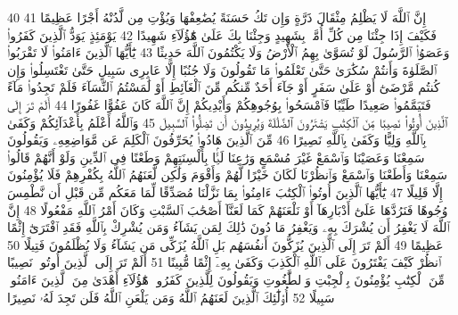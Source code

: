 {\tiny\colorbox{cl_aya}{40}} إِنَّ ٱللَّهَ لَا يَظْلِمُ مِثْقَالَ ذَرَّةٍ وَإِن تَكُ حَسَنَةً يُضَٰعِفْهَا وَيُؤْتِ مِن لَّدُنْهُ أَجْرًا عَظِيمًا
{\tiny\colorbox{cl_aya}{41}} فَكَيْفَ إِذَا جِئْنَا مِن كُلِّ أُمَّةٍۭ بِشَهِيدٍ وَجِئْنَا بِكَ عَلَىٰ هَٰٓؤُلَآءِ شَهِيدًا
{\tiny\colorbox{cl_aya}{42}} يَوْمَئِذٍ يَوَدُّ ٱلَّذِينَ كَفَرُوا۟ وَعَصَوُا۟ ٱلرَّسُولَ لَوْ تُسَوَّىٰ بِهِمُ ٱلْأَرْضُ وَلَا يَكْتُمُونَ ٱللَّهَ حَدِيثًا
{\tiny\colorbox{cl_aya}{43}} يَٰٓأَيُّهَا ٱلَّذِينَ ءَامَنُوا۟ لَا تَقْرَبُوا۟ ٱلصَّلَوٰةَ وَأَنتُمْ سُكَٰرَىٰ حَتَّىٰ تَعْلَمُوا۟ مَا تَقُولُونَ وَلَا جُنُبًا إِلَّا عَابِرِى سَبِيلٍ حَتَّىٰ تَغْتَسِلُوا۟ وَإِن كُنتُم مَّرْضَىٰٓ أَوْ عَلَىٰ سَفَرٍ أَوْ جَآءَ أَحَدٌ مِّنكُم مِّنَ ٱلْغَآئِطِ أَوْ لَٰمَسْتُمُ ٱلنِّسَآءَ فَلَمْ تَجِدُوا۟ مَآءً فَتَيَمَّمُوا۟ صَعِيدًا طَيِّبًا فَٱمْسَحُوا۟ بِوُجُوهِكُمْ وَأَيْدِيكُمْ إِنَّ ٱللَّهَ كَانَ عَفُوًّا غَفُورًا
{\tiny\colorbox{cl_aya}{44}} أَلَمْ تَرَ إِلَى ٱلَّذِينَ أُوتُوا۟ نَصِيبًا مِّنَ ٱلْكِتَٰبِ يَشْتَرُونَ ٱلضَّلَٰلَةَ وَيُرِيدُونَ أَن تَضِلُّوا۟ ٱلسَّبِيلَ
{\tiny\colorbox{cl_aya}{45}} وَٱللَّهُ أَعْلَمُ بِأَعْدَآئِكُمْ وَكَفَىٰ بِٱللَّهِ وَلِيًّا وَكَفَىٰ بِٱللَّهِ نَصِيرًا
{\tiny\colorbox{cl_aya}{46}} مِّنَ ٱلَّذِينَ هَادُوا۟ يُحَرِّفُونَ ٱلْكَلِمَ عَن مَّوَاضِعِهِۦ وَيَقُولُونَ سَمِعْنَا وَعَصَيْنَا وَٱسْمَعْ غَيْرَ مُسْمَعٍ وَرَٰعِنَا لَيًّۢا بِأَلْسِنَتِهِمْ وَطَعْنًا فِى ٱلدِّينِ وَلَوْ أَنَّهُمْ قَالُوا۟ سَمِعْنَا وَأَطَعْنَا وَٱسْمَعْ وَٱنظُرْنَا لَكَانَ خَيْرًا لَّهُمْ وَأَقْوَمَ وَلَٰكِن لَّعَنَهُمُ ٱللَّهُ بِكُفْرِهِمْ فَلَا يُؤْمِنُونَ إِلَّا قَلِيلًا
{\tiny\colorbox{cl_aya}{47}} يَٰٓأَيُّهَا ٱلَّذِينَ أُوتُوا۟ ٱلْكِتَٰبَ ءَامِنُوا۟ بِمَا نَزَّلْنَا مُصَدِّقًا لِّمَا مَعَكُم مِّن قَبْلِ أَن نَّطْمِسَ وُجُوهًا فَنَرُدَّهَا عَلَىٰٓ أَدْبَارِهَآ أَوْ نَلْعَنَهُمْ كَمَا لَعَنَّآ أَصْحَٰبَ ٱلسَّبْتِ وَكَانَ أَمْرُ ٱللَّهِ مَفْعُولًا
{\tiny\colorbox{cl_aya}{48}} إِنَّ ٱللَّهَ لَا يَغْفِرُ أَن يُشْرَكَ بِهِۦ وَيَغْفِرُ مَا دُونَ ذَٰلِكَ لِمَن يَشَآءُ وَمَن يُشْرِكْ بِٱللَّهِ فَقَدِ ٱفْتَرَىٰٓ إِثْمًا عَظِيمًا
{\tiny\colorbox{cl_aya}{49}} أَلَمْ تَرَ إِلَى ٱلَّذِينَ يُزَكُّونَ أَنفُسَهُم بَلِ ٱللَّهُ يُزَكِّى مَن يَشَآءُ وَلَا يُظْلَمُونَ فَتِيلًا
{\tiny\colorbox{cl_aya}{50}} ٱنظُرْ كَيْفَ يَفْتَرُونَ عَلَى ٱللَّهِ ٱلْكَذِبَ وَكَفَىٰ بِهِۦٓ إِثْمًا مُّبِينًا
{\tiny\colorbox{cl_aya}{51}} أَلَمْ تَرَ إِلَى ٱلَّذِينَ أُوتُوا۟ نَصِيبًا مِّنَ ٱلْكِتَٰبِ يُؤْمِنُونَ بِٱلْجِبْتِ وَٱلطَّٰغُوتِ وَيَقُولُونَ لِلَّذِينَ كَفَرُوا۟ هَٰٓؤُلَآءِ أَهْدَىٰ مِنَ ٱلَّذِينَ ءَامَنُوا۟ سَبِيلًا
{\tiny\colorbox{cl_aya}{52}} أُو۟لَٰٓئِكَ ٱلَّذِينَ لَعَنَهُمُ ٱللَّهُ وَمَن يَلْعَنِ ٱللَّهُ فَلَن تَجِدَ لَهُۥ نَصِيرًا
